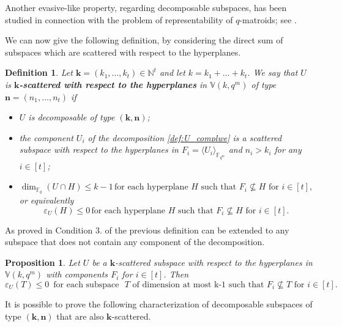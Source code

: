 \documentclass[11pt]{amsart}
\newtheorem{definition}[theorem]{Definition}
\newtheorem{proposition}[theorem]{Proposition}
\newcommand{\fqm}{\mathbb{F}_{q^m}}
\newcommand{\fq}{{\mathbb F}_{q}}
\begin{document}
Another evasive-like property, regarding decomposable subspaces, has been studied in connection with the problem of representability of $q$-matroids; see \cite{alfarano2024representability}.


We can now give the following definition, by considering the direct sum of subspaces which are scattered with respect to the hyperplanes.

\begin{definition} \label{def:kbold-scattered}
    Let $\mathbf{k}=(k_1,\ldots,k_t)\in\mathbb N^t$ and let $k=k_1+\ldots+k_t$. We say that $U$ is \textbf{$\mathbf{k}$-scattered with respect to the hyperplanes} in $\mathbb{V}(k,q^m)$ of type $\mathbf{n}=(n_1,\dots,n_t)$ if 
    \begin{itemize}
        \item[1.] $U$ is decomposable of type $(\mathbf{k}, \mathbf{n})$;
        \item[2.]  the component $U_i$ of the decomposition \eqref{def:U_complwe} is a  scattered subspace with respect to the hyperplanes in $F_i=\langle U_i\rangle_{\fqm}$ and $n_i > k_i$ for any $i\in [t]$;
        \item[3.]  $\dim_{\fq}(U\cap H)\leq k-1 \, \mbox{for each hyperplane}  \,\,   H\mbox{ such that }  F_i\not\subseteq H \mbox{ for } i\in [t],$
        or equivalently
         \[
 \varepsilon_U(H)\leq 0 \, \mbox{for each hyperplane}  \,\,   H \mbox{ such that }  F_i\not\subseteq H \mbox{ for } i\in [t].
\]
\end{itemize} 
\end{definition}

As proved in \cite[Lemma 2.3]{alfarano2024representability} Condition $3.$ of the previous definition can be extended to any subspace that does not contain any component of the decomposition. 

\begin{proposition} \label{prop:nonpositive_defect}
  Let $U$ be  a $\mathbf{k}$-scattered subspace with respect to the hyperplanes in $\mathbb{V}(k,q^m)$ with components $F_i$ for $i\in [t]$. Then 
  \[\varepsilon_U(T)\leq 0 \,  \mbox{ for each subspace }  \,\,   T \mbox{ of dimension at most k-1 such that }  F_i\not\subseteq T \mbox{ for } i\in [t].\]
\end{proposition}





It is possible to prove the following characterization of decomposable subspaces of type $(\mathbf{k}, \mathbf{n})$ that are also $\mathbf{k}$-scattered.
\end{document}
